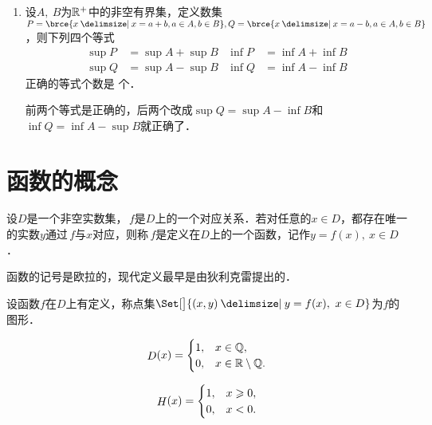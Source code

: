 \begin{enumerate}
\item 设\(A,\ B\)为\(\mathbb{R}^+\)中的非空有界集，定义数集\(P = \brce{x \mid x = a + b, a \in A, b \in B}, Q = \brce{x \mid x = a - b, a \in A, b \in B}\)，则下列四个等式
  \begin{align*}
    \sup P &= \sup A + \sup B & \inf P &= \inf A + \inf B \\
    \sup Q &= \sup A - \sup B & \inf Q &= \inf A - \inf B
  \end{align*}
  正确的等式个数是
  \ifshowsol
  \uline{}%
  \else
  \uline{\makebox[4em]{}}%
  \fi
  个．

  \ifshowsol
  前两个等式是正确的，后两个改成\(\sup Q = \sup A - \inf B\)和\(\inf Q = \inf A - \sup B\)就正确了．
  \fi
\end{enumerate}
\fi

\section{函数的概念}

\begin{definition*}
  设\(D\)是一个非空实数集，\(\,f\)是\(D\)上的一个对应关系．若对任意的\(x \in D\)，都存在唯一的实数\(y\)通过\(\,f\)与\(x\)对应，则称\(\,f\)是定义在\(D\)上的一个函数，记作\(y = f(x),\ x \in D\)．
\end{definition*}

函数的记号是欧拉的，现代定义最早是由狄利克雷提出的．

\begin{definition*}
  设函数\(f\)在\(D\)上有定义，称点集\(\Set[\big]{(x,y) \mid y = f(x),\ x \in D}\)为\(f\)的图形．
\end{definition*}

\begin{definition}[狄利克雷函数]
  \label{defn:dirichlet}
  \[
    \mathop{\relax D}\nolimits(x) =
    \begin{cases}
      1, & x \in \mathbb{Q}, \\
      0, & x \in \mathbb{R} \setminus \mathbb{Q}.
    \end{cases}
  \]
\end{definition}

\begin{definition}[单位阶跃函数]
  \label{defn:heaviside}
  \[
    \Fn H(x) =
    \begin{cases}
      1, & x \ge 0, \\
      0, & x < 0.
    \end{cases}
  \]
\end{definition}

